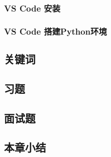 \subsubsection{ VS Code 安装}
\subsubsection{ VS Code 搭建Python环境}
\subsection{关键词}
\subsection{习题}
\subsection{面试题}
\subsection{本章小结}